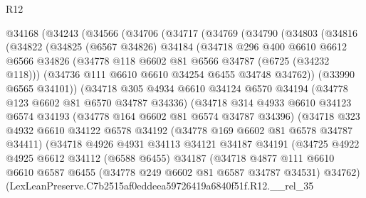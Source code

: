 \begin{lexlean}{R12}
\begin{coremodule}
  @34168
    (@34243
      (@34566
        (@34706
          (@34717
            (@34769
              (@34790
                (@34803
                  (@34816
                    (@34822
                      (@34825
                        (@6567 @34826)
                        @34184
                        (@34718
                          @296
                          @400
                          @6610
                          @6612
                          @6566
                          @34826
                          (@34778 @118 @6602 @81 @6566 @34787 (@6725 (@34232 @118)))
                          (@34736 @111 @6610 @6610 @34254 @6455 @34748 @34762))
                        (@33990 @6565 @34101))
                      (@34718
                        @305
                        @4934
                        @6610
                        @34124
                        @6570
                        @34194
                        (@34778 @123 @6602 @81 @6570 @34787 @34336)
                        (@34718
                          @314
                          @4933
                          @6610
                          @34123
                          @6574
                          @34193
                          (@34778 @164 @6602 @81 @6574 @34787 @34396)
                          (@34718
                            @323
                            @4932
                            @6610
                            @34122
                            @6578
                            @34192
                            (@34778 @169 @6602 @81 @6578 @34787 @34411)
                            (@34718
                              @4926
                              @4931
                              @34113
                              @34121
                              @34187
                              @34191
                              (@34725
                                @4922
                                @4925
                                @6612
                                @34112
                                (@6588 @6455)
                                @34187
                                (@34718
                                  @4877
                                  @111
                                  @6610
                                  @6610
                                  @6587
                                  @6455
                                  (@34778 @249 @6602 @81 @6587 @34787 @34531)
                                  @34762)
                                (LexLeanPreserve.C7b2515af0eddeea59726419a6840f51f.R12.__rel_35

\end{coremodule}
\end{lexlean}
